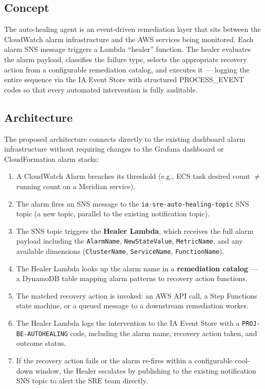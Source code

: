 \subsection{Concept}

The auto-healing agent is an event-driven remediation layer that sits between
the CloudWatch alarm infrastructure and the AWS services being monitored.
Each alarm SNS message triggers a Lambda ``healer'' function. The healer
evaluates the alarm payload, classifies the failure type, selects the
appropriate recovery action from a configurable remediation catalog, and
executes it --- logging the entire sequence via the IA Event Store with
structured PROCESS\_EVENT codes so that every automated intervention is
fully auditable.

\subsection{Architecture}

The proposed architecture connects directly to the existing dashboard alarm
infrastructure without requiring changes to the Grafana dashboard or
CloudFormation alarm stacks:

\begin{enumerate}
    \item A CloudWatch Alarm breaches its threshold (e.g., ECS task desired
          count $\neq$ running count on a Meridian service).
    \item The alarm fires an SNS message to the \texttt{ia-sre-auto-healing-topic}
          SNS topic (a new topic, parallel to the existing notification topic).
    \item The SNS topic triggers the \textbf{Healer Lambda}, which receives
          the full alarm payload including the \texttt{AlarmName},
          \texttt{NewStateValue}, \texttt{MetricName}, and any available
          dimensions (\texttt{ClusterName}, \texttt{ServiceName},
          \texttt{FunctionName}).
    \item The Healer Lambda looks up the alarm name in a
          \textbf{remediation catalog} --- a DynamoDB table mapping alarm
          patterns to recovery action functions.
    \item The matched recovery action is invoked: an AWS API call, a Step
          Functions state machine, or a queued message to a downstream
          remediation worker.
    \item The Healer Lambda logs the intervention to the IA Event Store
          with a \texttt{PROJ-BE-AUTOHEALING} code, including the alarm
          name, recovery action taken, and outcome status.
    \item If the recovery action fails or the alarm re-fires within a
          configurable cool-down window, the Healer escalates by publishing
          to the existing notification SNS topic to alert the SRE team
          directly.
\end{enumerate}

